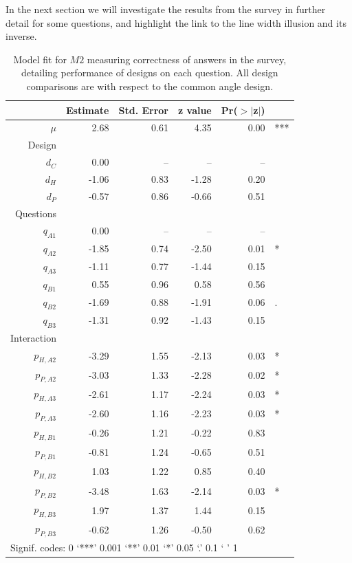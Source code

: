 In the next section we will investigate the results from the survey in further detail for some questions, and highlight the link to the line width illusion and its inverse.
\begin{table}[ht]
\begin{center}
\begin{tabular}{rrrrrl}
  \hline
 & Estimate & Std. Error & z value & Pr($>$$|$z$|$) & \\ 
  \hline  
$\mu$ & 2.68 & 0.61 & 4.35 & 0.00  & ***\\ [5pt]
Design\\
  $d_C$ & 0.00 & -- & -- & -- \\ 
  $d_H$ & -1.06 & 0.83 & -1.28 & 0.20  \\ 
  $d_P$ & -0.57 & 0.86 & -0.66 & 0.51 \\ [5pt]
Questions\\
  $q_{A1}$ & 0.00 & -- & -- & -- \\ 
  $q_{A2}$  & -1.85 & 0.74 & -2.50 & 0.01 &* \\ 
  $q_{A3}$  & -1.11 & 0.77 & -1.44 & 0.15 \\ 
  $q_{B1}$ & 0.55 & 0.96 & 0.58 & 0.56 \\ 
  $q_{B2}$  & -1.69 & 0.88 & -1.91 & 0.06 &. \\ 
  $q_{B3}$  & -1.31 & 0.92 & -1.43 & 0.15 \\ [5pt]
 
Interaction \\
$p_{H, A2}$ &  -3.29 & 1.55 & -2.13 & 0.03 & *\\ 
$p_{P,A2}$ & -3.03 & 1.33 & -2.28 & 0.02 &*\\ 
$p_{H,A3}$ &-2.61 & 1.17 & -2.24 & 0.03  & * \\ 
$p_{P,A3}$ & -2.60 & 1.16 & -2.23 & 0.03 &*\\ 
$p_{H,B1}$ &-0.26 & 1.21 & -0.22 & 0.83 \\ 
$p_{P,B1}$ &-0.81 & 1.24 & -0.65 & 0.51 \\ 
$p_{H,B2}$ & 1.03 & 1.22 & 0.85 & 0.40 \\ 
$p_{P,B2}$  & -3.48 & 1.63 & -2.14 & 0.03 &*\\ 
$p_{H,B3}$ & 1.97 & 1.37 & 1.44 & 0.15 \\ 
$p_{P,B3}$ & -0.62 & 1.26 & -0.50 & 0.62 \\   
   \hline
\multicolumn{6}{l}{Signif. codes:  0 `***' 0.001 `**' 0.01 `*' 0.05 `.' 0.1 ` ' 1 }
\end{tabular}
\end{center}
\caption{\label{model2} Model fit for $M2$ measuring correctness of answers in the survey, detailing performance of designs on each question. All design comparisons are with respect to the common angle design. }
\end{table}

